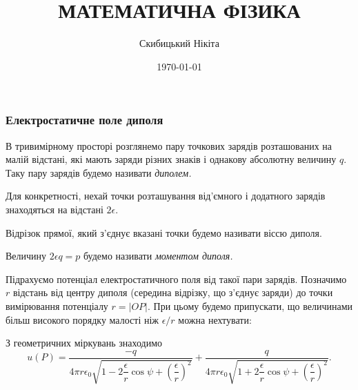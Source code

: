 

\title{{\Huge МАТЕМАТИЧНА ФІЗИКА}}
\author{Скибицький Нікіта}
\date{\today}





\tableofcontents

\setcounter{section}{3}
\setcounter{subsection}{5}
\setcounter{subsubsection}{4}
\setcounter{theorem}{14}
\setcounter{equation}{30}

\subsubsection{Електростатичне поле диполя}

\begin{definition}[диполя]
	В тривимірному просторі розглянемо пару точкових зарядів розташованих на малій відстані, які мають заряди різних знаків і однакову абсолютну величину $q$. Таку пару зарядів будемо називати \it{диполем}.
\end{definition}

Для конкретності, нехай точки розташування від'ємного і додатного зарядів знаходяться на відстані $2 \epsilon$. 

\begin{definition}
	Відрізок прямої, який з'єднує вказані точки будемо називати віссю диполя.
\end{definition}

\begin{definition}
	Величину $2 \epsilon q = p$ будемо називати \it{моментом диполя}.
\end{definition}

Підрахуємо потенціал електростатичного поля від такої пари зарядів. Позначимо $r$ відстань від центру диполя (середина відрізку, що з'єднує заряди) до точки вимірювання потенціалу $r = |OP|$. При цьому будемо припускати, що величинами більш високого порядку малості ніж $\epsilon/r$ можна нехтувати:
\begin{figure}[H]
	\centering
\end{figure}
 
З геометричних міркувань знаходимо
\begin{equation}
	u(P) = \dfrac{-q}{4\pi r\epsilon_0 \sqrt{1-2\dfrac{\epsilon}{r}\cos\psi+\left(\dfrac{\epsilon}{r}\right)^2}} + \dfrac{q}{4\pi r\epsilon_0 \sqrt{1+2\dfrac{\epsilon}{r}\cos\psi+\left(\dfrac{\epsilon}{r}\right)^2}}.
\end{equation}

